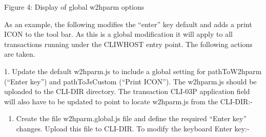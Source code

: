 \documentclass[letterpaper,10pt,english]{sphinxmanual}
\begin{document}
Figure 4: Display of global w2hparm options

As an example, the following modifies the “enter” key default and adds a print ICON to the tool bar. As this is a global modification it will apply to all transactions running under the CLIWHOST entry point. The following actions are taken.

1. Update the default w2hparm.js to include a global setting for pathToW2hparm (“Enter key”) and pathToJsCustom (“Print ICON”). The w2hparm.js should be uploaded to the CLI-DIR directory. The transaction CLI-03P application field will also have to be updated to point to locate w2hparm.js from the CLI-DIR:-

\begin{sphinxVerbatim}[commandchars=\\\{\}]
   
\end{sphinxVerbatim}
\begin{enumerate}
\def\theenumi{\arabic{enumi}}
\def\labelenumi{\theenumi .}
\makeatletter\def\p@enumii{\p@enumi \theenumi .}\makeatother
\setcounter{enumi}{1}
\item {} 
Create the file w2hparm.global.js file and define the required “Enter key” changes. Upload this file to CLI-DIR. To modify the keyboard Enter key:-

\end{enumerate}
\end{document}
